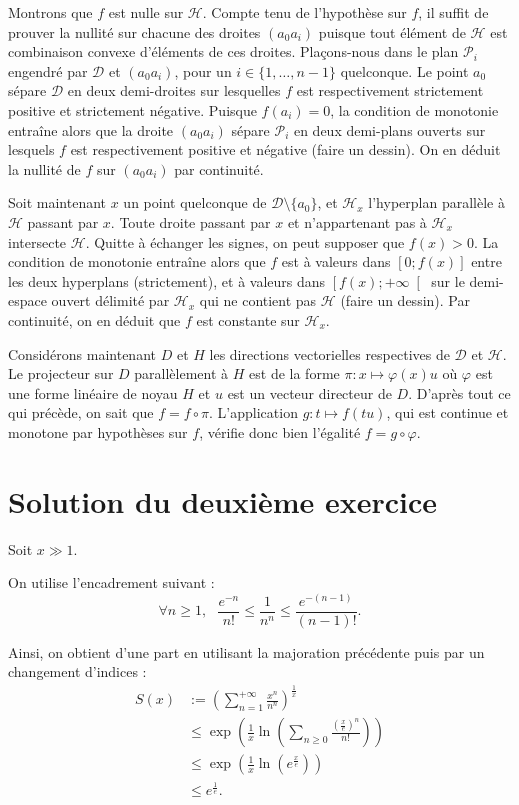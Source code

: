 Montrons que $f$ est nulle sur $\mathcal H$. Compte tenu de l'hypothèse sur $f$, il suffit de prouver la nullité sur chacune des droites $(a_0a_i)$ puisque tout élément de $\mathcal H$ est combinaison convexe d'éléments de ces droites.
Plaçons-nous dans le plan $\mathcal P_i$ engendré par $\mathcal D$ et $(a_0a_i)$, pour un $i \in \{1,\dots,n-1\}$ quelconque.
Le point $a_0$ sépare $\mathcal D$ en deux demi-droites sur lesquelles $f$ est respectivement strictement positive et strictement négative.
Puisque $f(a_i) = 0$, la condition de monotonie entraîne alors que la droite $(a_0a_i)$ sépare $\mathcal P_i$ en deux demi-plans ouverts sur lesquels $f$ est respectivement positive et négative (faire un dessin).
On en déduit la nullité de $f$ sur $(a_0a_i)$ par continuité.

Soit maintenant $x$ un point quelconque de $\mathcal D\setminus \{a_0\}$, et $\mathcal H_x$ l'hyperplan parallèle à $\mathcal H$ passant par $x$.
Toute droite passant par $x$ et n'appartenant pas à $\mathcal H_x$ intersecte $\mathcal H$.
Quitte à échanger les signes, on peut supposer que $f(x) > 0$.
La condition de monotonie entraîne alors que $f$ est à valeurs dans $[0;f(x)]$ entre les deux hyperplans (strictement), et à valeurs dans $\left[f(x);+\infty\right[$ sur le demi-espace ouvert délimité par $\mathcal H_x$ qui ne contient pas $\mathcal H$ (faire un dessin). Par continuité, on en déduit que $f$ est constante sur $\mathcal H_x$.

Considérons maintenant $D$ et $H$ les directions vectorielles respectives de $\mathcal D$ et $\mathcal H$.
Le projecteur sur $D$ parallèlement à $H$ est de la forme $\pi : x \mapsto \varphi(x)u$ où $\varphi$ est une forme linéaire de noyau $H$ et $u$ est un vecteur directeur de $D$.
D'après tout ce qui précède, on sait que $f = f \circ \pi$.
L'application $g : t \mapsto f(tu)$, qui est continue et monotone par hypothèses sur $f$, vérifie donc bien l'égalité $f = g \circ \varphi$.


\section{Solution du deuxième exercice}

Soit $x\gg 1.$

On utilise l'encadrement suivant :
$$\forall n\geq 1, \mbox{ } \frac{e^{-n}}{n!}\leq \frac{1}{n^{n}}\leq \frac{e^{-(n-1)}}{(n-1)!}.$$

Ainsi, on obtient d'une part en utilisant la majoration précédente puis par un changement d'indices : 
\begin{align*}
S(x) & := \left(\sum_{n=1}^{+\infty}\frac{x^{n}}{n^{n}}\right)^{\frac{1}{x}}\\
& \leq \exp\left( \frac{1}{x}\ln\left( \sum_{n\geq 0}\frac{(\frac{x}{e})^{n}}{n!}\right)\right)\\
& \leq \exp\left( \frac{1}{x}\ln(e^{\frac{x}{e}})\right)\\
& \leq e^{\frac{1}{e}}.
\end{align*}


